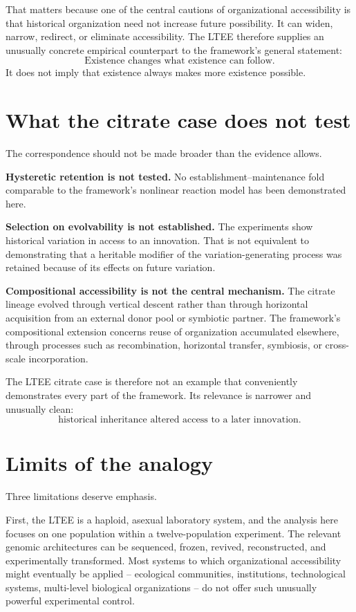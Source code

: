 \documentclass[11pt]{article}
\begin{document}
That matters because one of the central cautions of organizational accessibility is that historical organization need not increase future possibility. It can widen, narrow, redirect, or eliminate accessibility. The LTEE therefore supplies an unusually concrete empirical counterpart to the framework's general statement:
\[
\boxed{\text{Existence changes what existence can follow.}}
\]
It does not imply that existence always makes more existence possible.

\section{What the citrate case does not test}

The correspondence should not be made broader than the evidence allows.

\textbf{Hysteretic retention is not tested.} No establishment--maintenance fold comparable to the framework's nonlinear reaction model has been demonstrated here.

\textbf{Selection on evolvability is not established.} The experiments show historical variation in access to an innovation. That is not equivalent to demonstrating that a heritable modifier of the variation-generating process was retained because of its effects on future variation.

\textbf{Compositional accessibility is not the central mechanism.} The citrate lineage evolved through vertical descent rather than through horizontal acquisition from an external donor pool or symbiotic partner. The framework's compositional extension concerns reuse of organization accumulated elsewhere, through processes such as recombination, horizontal transfer, symbiosis, or cross-scale incorporation.

The LTEE citrate case is therefore not an example that conveniently demonstrates every part of the framework. Its relevance is narrower and unusually clean:
\[
\boxed{\text{historical inheritance altered access to a later innovation}.}
\]

\section{Limits of the analogy}

Three limitations deserve emphasis.

First, the LTEE is a haploid, asexual laboratory system, and the analysis here focuses on one population within a twelve-population experiment. The relevant genomic architectures can be sequenced, frozen, revived, reconstructed, and experimentally transformed. Most systems to which organizational accessibility might eventually be applied -- ecological communities, institutions, technological systems, multi-level biological organizations -- do not offer such unusually powerful experimental control.
\end{document}
